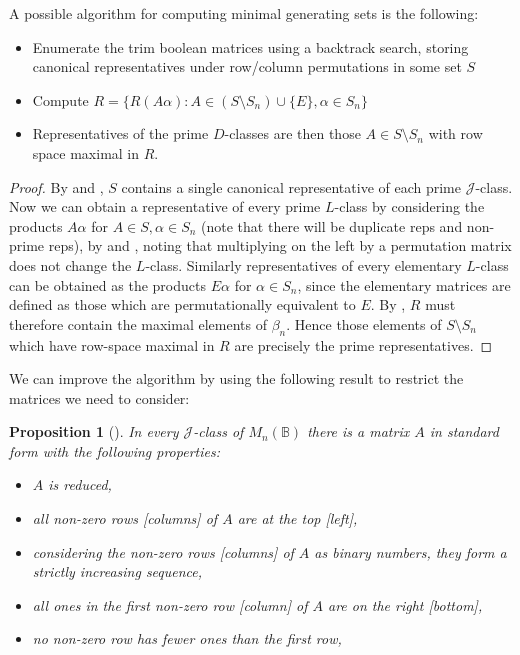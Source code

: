 \documentclass[11pt]{article}
\newtheorem{prop}[thm]{Proposition}
\numberwithin{equation}{section}
\newcommand{\set}[2]{\ensuremath{\{#1 : #2 \}}}
\newcommand{\B}{\mathbb{B}}
\newcommand{\Bn}{M_n(\B)}
\newcommand{\J}{\mathscr{J}}
\begin{document}
A possible algorithm for computing minimal generating sets is the following:

\begin{itemize}
  \item
    Enumerate the trim boolean matrices using a backtrack search, storing 
    canonical representatives under row/column permutations in some set $S$
  \item 
    Compute $R = \set{R(A\alpha)}{A \in (S\setminus S_n) \cup \{E\}, \alpha \in S_n}$
  \item 
    Representatives of the prime $D$-classes are then those $A \in S\setminus S_n$ 
    with row space maximal in $R$.
\end{itemize}

\begin{proof}
  By  and ,
  $S$ contains a single canonical representative of each prime $\J$-class.
  Now we can obtain a representative of every prime $L$-class by considering the
  products $A\alpha$ for $A \in S, \alpha \in S_n$ (note that there will be
  duplicate reps and non-prime reps), by  and
  , noting that multiplying on the left by a
  permutation matrix does not change the $L$-class.
  Similarly representatives of every elementary $L$-class can be obtained as the
  products $E\alpha$ for $\alpha \in S_n$, since the elementary matrices are
  defined as those which are permutationally equivalent to $E$.
  By , $R$ must therefore contain the maximal
  elements of $\beta_n$. Hence those elements of $S \setminus S_n$ which have
  row-space maximal in $R$ are precisely the prime representatives. 
\end{proof}

We can improve the algorithm by using the following result
to restrict the matrices we need to consider:

\begin{prop}[\cite{Breen1997}]
  In every $\J$-class of $\Bn$ there is a matrix $A$ in \emph{standard form} with the following properties:
  \begin{itemize}
  \item{$A$ is reduced,}
  \item{all non-zero rows [columns] of $A$ are at the top [left],}
  \item{considering the non-zero rows [columns] of $A$ as binary numbers, they
        form a strictly increasing sequence,}
  \item{all ones in the first non-zero row [column] of $A$ are on the right
        [bottom],}
  \item{no non-zero row has fewer ones than the first row,}
  \end{itemize}
\end{prop}
\end{document}
